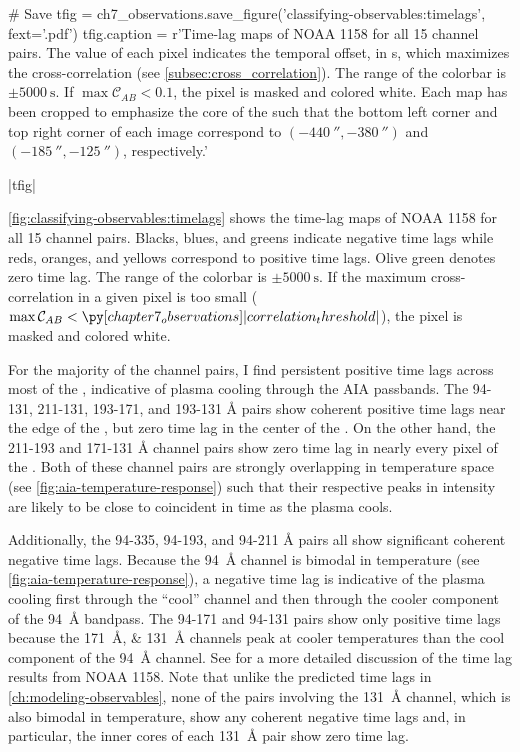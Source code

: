 \begin{pycode}
# Save
tfig = ch7_observations.save_figure('classifying-observables:timelags', fext='.pdf')
tfig.caption = r'Time-lag maps of \AR{} NOAA 1158 for all 15 channel pairs. The value of each pixel indicates the temporal offset, in \si{\second}, which maximizes the cross-correlation (see \autoref{subsec:cross_correlation}). The range of the colorbar is $\pm\SI{5000}{\second}$. If $\max\mathcal{C}_{AB}<0.1$, the pixel is masked and colored white. Each map has been cropped to emphasize the core of the \AR{} such that the bottom left corner and top right corner of each image correspond to $(\SI{-440}{\arcsecond},\SI{-380}{\arcsecond})$ and $(\SI{-185}{\arcsecond},\SI{-125}{\arcsecond})$, respectively.'
\end{pycode}
|tfig|

\autoref{fig:classifying-observables:timelags} shows the time-lag maps of \AR{} NOAA 1158 for all 15 channel pairs. Blacks, blues, and greens indicate negative time lags while reds, oranges, and yellows correspond to positive time lags. Olive green denotes zero time lag. The range of the colorbar is $\pm\SI{5000}{\second}$. If the maximum cross-correlation in a given pixel is too small ($\max\mathcal{C}_{AB}<\py[chapter7_observations]|correlation_threshold|$), the pixel is masked and colored white.

For the majority of the channel pairs, I find persistent positive time lags across most of the \AR{}, indicative of plasma cooling through the AIA passbands. The 94-131, 211-131, 193-171, and 193-131 \si{\angstrom} pairs show coherent positive time lags near the edge of the \AR{}, but zero time lag in the center of the \AR{}. On the other hand, the 211-193 and 171-131 \si{\angstrom} channel pairs show zero time lag in nearly every pixel of the \AR{}. Both of these channel pairs are strongly overlapping in temperature space (see \autoref{fig:aia-temperature-response}) such that their respective peaks in intensity are likely to be close to coincident in time as the plasma cools. 

Additionally, the 94-335, 94-193, and 94-211 \si{\angstrom} pairs all show significant coherent negative time lags. Because the \SI{94}{\angstrom} channel is bimodal in temperature (see \autoref{fig:aia-temperature-response}), a negative time lag is indicative of the plasma cooling first through the ``cool'' channel and then through the cooler component of the \SI{94}{\angstrom} bandpass. The 94-171 and 94-131 pairs show only positive time lags because the \SIlist{171;131}{\angstrom} channels peak at cooler temperatures than the cool component of the \SI{94}{\angstrom} channel. See \citet{viall_survey_2017} for a more detailed discussion of the time lag results from NOAA 1158. Note that unlike the predicted time lags in \autoref{ch:modeling-observables}, none of the pairs involving the \SI{131}{\angstrom} channel, which is also bimodal in temperature, show any coherent negative time lags and, in particular, the inner cores of each \SI{131}{\angstrom} pair show zero time lag.

